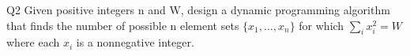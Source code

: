 \begin{problem}
  {Q2}
  Given positive integers n and W, design a dynamic programming algorithm that finds
  the number of possible n element sets $\{x_1, \dots , x_n\}$ for which $\sum_i x_i^2 = W$ where each
  $x_i$ is a nonnegative integer.
\end{problem}
